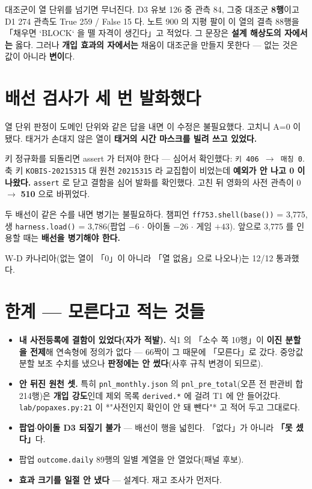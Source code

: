 \documentclass{article}
\begin{document}
{대조군이 열 단위를 넘기면 무너진다. D3 유보 126 중 관측 84, 그중 대조군 \textbf{8행}이고
D1 274 관측도 True 259 / False 15 다.}
노트 900 의 지평 팔이 이 열의 결측 88행을 「채우면 `BLOCK` 을 뗄 자격이 생긴다」고 적었다.
그 문장은 \textbf{설계 해상도의 자에서는} 옳다. 그러나 \textbf{개입 효과의 자에서는} 채움이
대조군을 만들지 못한다 --- 없는 것은 값이 아니라 \textbf{변이}다.

\section{배선 검사가 세 번 발화했다}

{열 단위 판정이 도메인 단위와 같은 답을 내면 이 수정은 불필요했다. 고치니 A=0 이 됐다.}
태거가 손대지 않은 열이 \textbf{태거의 시간 마스크를 빌려 쓰고 있었다.}

{키 정규화를 되돌리면 assert 가 터져야 한다 --- 심어서 확인했다:
\texttt{키 406 $\to$ 매칭 0}.}
축 키 \texttt{KOBIS-20215315} 대 원천 \texttt{20215315} 라 교집합이 비었는데
\textbf{예외가 안 나고 0 이 나왔다.} \texttt{assert} 로 닫고 결함을 심어 발화를 확인했다.
고친 뒤 영화의 사전 관측이 0 $\to$ \textbf{510} 으로 바뀌었다.

{두 배선이 같은 수를 내면 병기는 불필요하다. 챔피언 \texttt{ff753.shell(base())} = 3{,}775,
생 \texttt{harness.load()} = 3{,}786(팝업 $-6$ $\cdot$ 아이돌 $-26$ $\cdot$ 게임 $+43$).}
앞으로 3{,}775 를 인용할 때는 \textbf{배선을 병기해야 한다.}

W-D 카나리아(없는 열이 「0」이 아니라 「열 없음」으로 나오나)는 12/12 통과했다.

\section{한계 --- 모른다고 적는 것들}

\begin{itemize}
\item \textbf{내 사전등록에 결함이 있었다(자가 적발).} 식1 의 「소수 쪽 10행」이
      \textbf{이진 분할을 전제}해 연속형에 정의가 없다 --- 66짝이 그 때문에 「모른다」로 갔다.
      중앙값 분할 보조 수치를 냈으나 \textbf{판정에는 안 썼다}(사후 규칙 변경이 되므로).
\item \textbf{안 뒤진 원천 셋.} 특히 \texttt{pnl\_monthly.json} 의
      \texttt{pnl\_pre\_total}(오픈 전 판관비 합 214행)은 \textbf{개입 강도}인데
      제외 목록 \texttt{derived.*} 에 걸려 T1 에 안 들어갔다.
      \texttt{lab/popaxes.py:21} 이 *"사전인지 확인이 안 돼 뺀다"* 고 적어 두고 그대로다.
\item \textbf{팝업$\cdot$아이돌 D3 되짚기 불가} --- 배선이 행을 넓힌다.
      「없다」가 아니라 \textbf{「못 셌다」}다.
\item 팝업 \texttt{outcome.daily} 89행의 일별 계열을 안 열었다(패널 후보).
\item \textbf{효과 크기를 일절 안 냈다} --- 설계다. 재고 조사가 먼저다.
\end{itemize}
\end{document}
